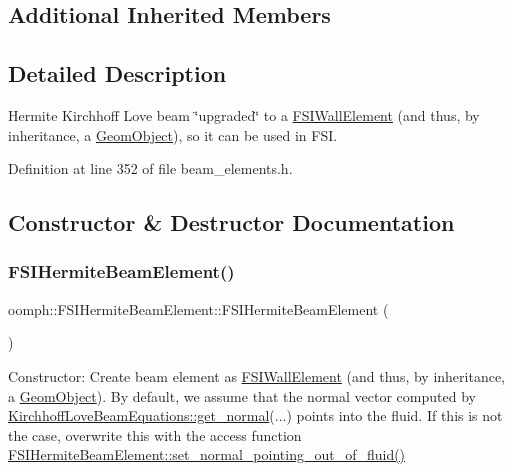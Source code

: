 \subsection*{Additional Inherited Members}


\subsection{Detailed Description}
Hermite Kirchhoff Love beam \char`\"{}upgraded\char`\"{} to a \hyperlink{classoomph_1_1FSIWallElement}{F\+S\+I\+Wall\+Element} (and thus, by inheritance, a \hyperlink{classoomph_1_1GeomObject}{Geom\+Object}), so it can be used in F\+SI. 

Definition at line 352 of file beam\+\_\+elements.\+h.



\subsection{Constructor \& Destructor Documentation}
\mbox{\label{classoomph_1_1FSIHermiteBeamElement_a40aec23a3e79d2bfcf3a54ab820a7d9b}} 
\subsubsection{\texorpdfstring{F\+S\+I\+Hermite\+Beam\+Element()}{FSIHermiteBeamElement()}}
{\footnotesize\ttfamily oomph\+::\+F\+S\+I\+Hermite\+Beam\+Element\+::\+F\+S\+I\+Hermite\+Beam\+Element (\begin{DoxyParamCaption}{ }\end{DoxyParamCaption})\hspace{0.3cm}{\ttfamily [inline]}}



Constructor\+: Create beam element as \hyperlink{classoomph_1_1FSIWallElement}{F\+S\+I\+Wall\+Element} (and thus, by inheritance, a \hyperlink{classoomph_1_1GeomObject}{Geom\+Object}). By default, we assume that the normal vector computed by \hyperlink{classoomph_1_1KirchhoffLoveBeamEquations_a963a2ffb3c4008e3b9c175fc1d2d94cc}{Kirchhoff\+Love\+Beam\+Equations\+::get\+\_\+normal}(...) points into the fluid. If this is not the case, overwrite this with the access function \hyperlink{classoomph_1_1FSIHermiteBeamElement_ad509b18e5fd5aae35a86f5c4372d3478}{F\+S\+I\+Hermite\+Beam\+Element\+::set\+\_\+normal\+\_\+pointing\+\_\+out\+\_\+of\+\_\+fluid()} 



